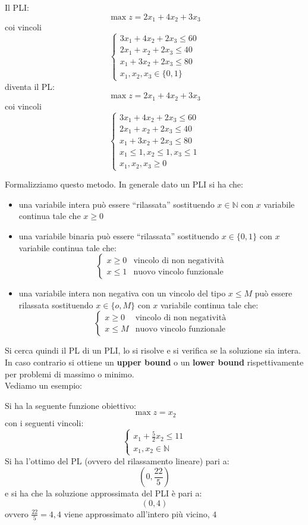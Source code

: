 \message{ !name(ro.tex)}\documentclass[a4paper,12pt, oneside]{book}
\begin{document}
\begin{esempio}
  Il PLI:
  \[\max z=2x_1+4x_2+3x_3\]
  coi vincoli
  \[
    \begin{cases}
      3x_1+4x_2+2x_3\leq 60\\
      2x_1+x_2+2x_3\leq 40\\
      x_1+3x_2+2x_3\leq 80\\
      x_1,x_2,x_3\in\{0,1\}
    \end{cases}
  \]
  diventa il PL:
  \[\max z=2x_1+4x_2+3x_3\]
  coi vincoli
  \[
    \begin{cases}
      3x_1+4x_2+2x_3\leq 60\\
      2x_1+x_2+2x_3\leq 40\\
      x_1+3x_2+2x_3\leq 80\\
      x_1\leq 1, x_2\leq 1, x_3\leq 1\\
      x_1,x_2,x_3\geq 0
    \end{cases}
  \]
\end{esempio}
Formalizziamo questo metodo. In generale dato un PLI si ha che:
\begin{itemize}
  \item una variabile intera può essere ``rilassata'' sostituendo
  $x\in\mathbb{N}$ con $x$ variabile continua tale che $x\geq 0$
  \item una variabile binaria può essere ``rilassata'' sostituendo
  $x\in\{0,1\}$ con $x$ variabile continua tale che:
  \[
    \begin{cases}
      x\geq 0 & \mbox{vincolo di non negatività}\\
      x\leq 1 & \mbox{nuovo vincolo funzionale}
    \end{cases}
  \]
  \item una variabile intera non negativa con un vincolo del tipo
  $x\leq M$ può essere rilassata sostituendo $x\in\{o,M\}$ con $x$
  variabile continua tale che:
  \[
    \begin{cases}
      x\geq 0 & \mbox{vincolo di non negatività}\\
      x\leq M & \mbox{nuovo vincolo funzionale}
    \end{cases}
  \]
\end{itemize}
Si cerca quindi il PL di un PLI, lo si risolve e si verifica se la
soluzione sia intera. In caso contrario si ottiene un \textbf{upper
  bound} o un \textbf{lower bound} rispettivamente per problemi di
massimo o minimo. \\
Vediamo un esempio:
\begin{esempio}
  Si ha la seguente funzione obiettivo:
  \[\max z=x_2\]
  con i seguenti vincoli:
  \[
    \begin{cases}
      x_1+\frac{5}{2}x_2\leq 11\\
      x_1,x_2\in\mathbb{N}
    \end{cases}
  \]
  Si ha l'ottimo del PL (ovvero del rilassamento lineare) pari a:
  \[\left(0,\frac{22}{5}\right)\]
  e si ha che la soluzione approssimata del PLI è pari a:
  \[(0,4)\]
  ovvero $\frac{22}{5}=4,4$ viene approssimato all'intero più vicino, $4$
\end{esempio}
\end{document}
